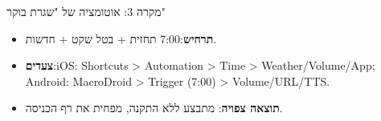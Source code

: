 \begin{tcbinfo}{מקרה 3: אוטומציה של "שגרת בוקר"}
\begin{itemize}
  \item \textbf{תרחיש}:7:00 תחזית + בטל שקט + חדשות.
  \item \textbf{צעדים}:iOS: Shortcuts > Automation > Time > Weather/Volume/App; Android: MacroDroid > Trigger (7:00) > Volume/URL/TTS.
  \item \textbf{תוצאה צפויה}: מתבצע ללא התקנה, מפחית את רף הכניסה.
\end{itemize}

\end{tcbinfo}
